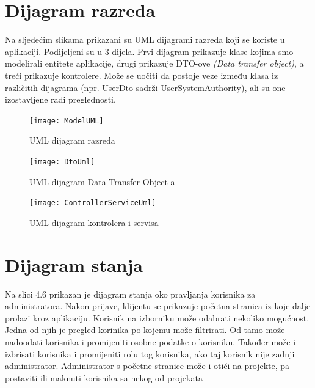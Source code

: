 			
		\section{Dijagram razreda}
		
			Na sljedećim slikama prikazani su UML dijagrami razreda koji se koriste u aplikaciji. Podijeljeni su u 3 dijela. Prvi dijagram prikazuje klase kojima smo modelirali entitete aplikacije, drugi prikazuje DTO-ove \textit{(Data transfer object)}, a treći prikazuje kontrolere. Može se uočiti da postoje veze između klasa iz različitih dijagrama (npr. UserDto sadrži UserSystemAuthority), ali su one izostavljene radi preglednosti.
			
			\begin{figure}[H]
				\texttt{[image: ModelUML]} %
				\centering
				\caption{UML dijagram razreda}
				\label{fig:modelUml}
			\end{figure}
			\begin{figure}[H]
				\texttt{[image: DtoUml]} %
				\centering
				\caption{UML dijagram Data Transfer Object-a}
				\label{fig:dtouml}
			\end{figure}
			\begin{figure}[H]
				\texttt{[image: ControllerServiceUml]} %
				\centering
				\caption{UML dijagram kontrolera i servisa}
				\label{fig:controllersServicesUml}
		\end{figure}
		
	
	\iffalse %
	
		\section{Dijagram stanja}
			
			

			{ Na slici 4.6 prikazan je dijagram stanja oko pravljanja korisnika za administratora.
			Nakon prijave, klijentu se prikazuje početna stranica iz koje dalje prolazi kroz aplikaciju.
			Korisnik na izborniku može odabrati nekoliko mogućnost. Jedna od njih je pregled korinika po kojemu može filtrirati.
			Od tamo može nadoodati korisnika i promijeniti osobne podatke o korisniku. Također može i izbrisati
			korisnika i promijeniti rolu tog korisnika, ako taj korisnik nije zadnji administrator. Administrator s
			početne stranice može i otići na projekte, pa postaviti ili maknuti korisnika sa nekog od projekata}

